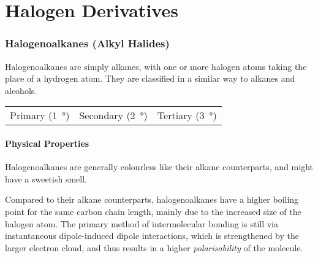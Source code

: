 

\pagebreak
\part{Halogen Derivatives}

	\section{Halogenoalkanes (Alkyl Halides)}

		Halogenoalkanes are simply alkanes, with one or more halogen atoms taking the place of a hydrogen atom. They are classified in a
		similar way to alkanes and alcohols.

		\begin{center}\begin{table}[ht]\renewcommand{\arraystretch}{1.4}
		\begin{tabu} to \textwidth {| X[c,m] | X[c,m] | X[c,m] |}

			\hline
			\vspace{2mm}					\vspace{2mm}	&
			\vspace{2mm}				\vspace{2mm}	&
			\vspace{2mm}		\vspace{2mm}	\\

			\hline
			Primary (\SI{1}{\degree})		&
			Secondary (\SI{2}{\degree})		&
			Tertiary (\SI{3}{\degree})		\\
			\hline

		\end{tabu}
		\end{table}\end{center}\vspace{-10mm}


		\subsection{Physical Properties}

			Halogenoalkanes are generally colourless like their alkane counterparts, and might have a sweetish smell.

			Compared to their alkane counterparts, halogenoalkanes have a higher boiling point for the same carbon chain length,
			mainly due to the increased size of the halogen atom. The primary method of intermolecular bonding is still via
			instantaneous dipole-induced dipole interactions, which is strengthened by the larger electron cloud, and thus results in
			a higher \textit{polarisability} of the molecule.

